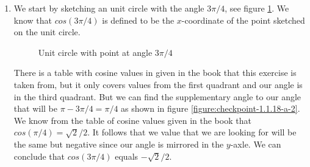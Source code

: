 \begin{enumerate}[label=(\alph*)]
  \item
    We start by sketching an unit circle with the angle $ 3\pi/4 $, see figure \ref{figure:checkpoint-1.1.18-a-1}. We know that $ cos(3\pi/4) $ is defined to be the $ x $-coordinate of the point sketched on the unit circle.

    \begin{figure}
      \centering
      \caption{Unit circle with point at angle $ 3\pi/4 $}
      \label{figure:checkpoint-1.1.18-a-1}
    \end{figure}

    There is a table with cosine values in given in the book that this exercise is taken from, but it only covers values from the first quadrant and our angle is in the third quadrant. But we can find the supplementary angle to our angle that will be $ \pi - 3\pi/4 = \pi/4 $ as shown in figure \ref{figure:checkpoint-1.1.18-a-2}. We know from the table of cosine values given in the book that $ cos(\pi/4) = \sqrt{2}/2 $. It follows that we value that we are looking for will be the same but negative since our angle is mirrored in the $y$-axle. We can conclude that $ cos(3\pi/4) $ equals $ -\sqrt{2}/2 $.

    \begin{figure}
      \centering
\end{figure}
\end{enumerate}
